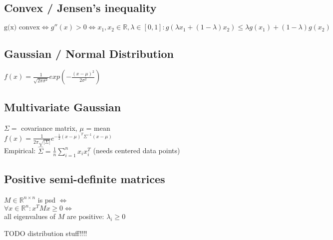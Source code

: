 \documentclass[11pt]{article}
\begin{document}
\begin{multicols*}{3}
\subsection*{Convex / Jensen's inequality}
$\text{g(x) convex} \Leftrightarrow g''(x) > 0 \Leftrightarrow x_1,x_2 \in \mathbb{R}, \lambda \in [0,1]: 
g(\lambda x_1 + (1-\lambda) x_2) \leq \lambda g(x_1) + (1-\lambda) g(x_2)$

\subsection*{Gaussian / Normal Distribution}
$f(x) = \frac{1}{\sqrt{2\pi\sigma^2}} exp(-\frac{(x-\mu)^2}{2\sigma^2})$

\subsection*{Multivariate Gaussian}
$\Sigma =$ covariance matrix, $\mu$ = mean\\
$f(x) = \frac{1}{2\pi \sqrt{|\Sigma|}} e^{- \frac{1}{2} (x-\mu)^T \Sigma^{-1} (x-\mu)}$\\
Empirical: $\hat{\Sigma} = \frac{1}{n}\sum_{i=1}^n x_i x_i^T$ (needs centered data points)

\subsection*{Positive semi-definite matrices}
$M \in \mathbb{R}^{n\times n}$ is psd $\Leftrightarrow$\\
$\forall x \in \mathbb{R}^n: x^TMx \geq 0 \Leftrightarrow$\\
all eigenvalues of $M$ are positive: $\lambda_i\geq 0$

TODO distribution stuff!!!!	
\end{multicols*}




	
\end{document}
